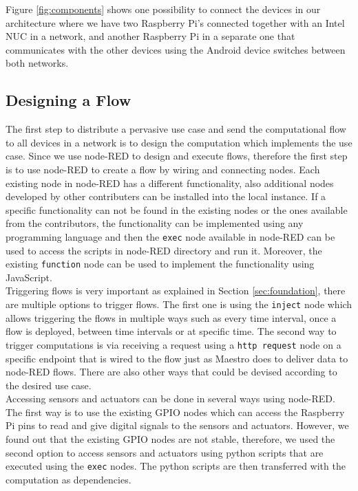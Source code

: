 \noindent Figure \ref{fig:components} shows one possibility to connect the devices in our architecture where we have two Raspberry Pi's connected together with an Intel NUC in a network, and another Raspberry Pi in a separate one that communicates with the other devices using the Android device  switches between both networks.

\subsection{Designing a Flow}
The first step to distribute a pervasive use case and send the computational flow to all devices in a network is to design the computation which implements the use case. Since we use node-RED to design and execute flows, therefore the first step is to use node-RED to create a flow by wiring and connecting nodes. Each existing node in node-RED has a different functionality, also additional nodes developed by other contributers can be installed into the local instance. If a specific functionality can not be found  in the existing nodes or the ones available from the contributors, the functionality can be implemented using any programming language and then  the \verb|exec| node available in node-RED can be used to access the scripts in node-RED directory and run it. Moreover, the  existing \verb|function| node can be used to implement the functionality using  JavaScript. \\

\noindent Triggering flows is very important as explained in Section \ref{sec:foundation}, there are multiple options to trigger flows. The first one is using the \verb|inject| node which allows  triggering the flows in multiple ways such as every time interval, once a flow is deployed, between time intervals or at specific time. The second way to trigger computations is via receiving a request using a \verb|http request| node on a specific endpoint that is wired to the flow just as Maestro does to deliver data to node-RED flows. There are also other ways that could be devised according to the desired use case.\\
 

\noindent Accessing sensors and actuators can be done in several ways using node-RED. The first way is to use the existing GPIO nodes which can access the Raspberry Pi pins to read  and give digital signals to the sensors and actuators. However, we found out that the existing GPIO nodes are not stable, therefore, we used the second option to access sensors and actuators using python scripts that are executed using the \verb|exec| nodes. The python scripts are then transferred with the computation as  dependencies.\\

